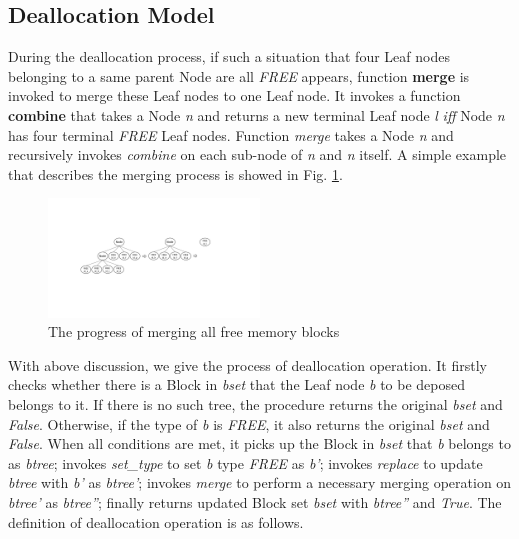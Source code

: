 \subsection{Deallocation Model}
During the deallocation process, if such a situation that four Leaf nodes belonging to a same parent Node are all \emph{FREE} appears, function \textbf{merge} is invoked to merge these Leaf nodes to one Leaf node. It invokes a function \textbf{combine} that takes a Node \emph{n} and returns a new terminal Leaf node \emph{l} \emph{iff} Node \emph{n} has four terminal \emph{FREE} Leaf nodes. Function \emph{merge} takes a Node \emph{n} and recursively invokes \emph{combine} on each sub-node of \emph{n} and \emph{n} itself. A simple example that describes the merging process is showed in Fig. \ref{fig2}.

\begin{figure}[htbp]
	\centering
	\includegraphics[width=0.5\textwidth]{fig2.pdf}
	\caption{The progress of merging all free memory blocks}
	\label{fig2}
\end{figure}

With above discussion, we give the process of deallocation operation. It firstly checks whether there is a Block in \emph{bset} that the Leaf node \emph{b} to be deposed belongs to it. If there is no such tree, the procedure returns the original \emph{bset} and \emph{False}. Otherwise, if the type of \emph{b} is \emph{FREE}, it also returns the original \emph{bset} and \emph{False}. When all conditions are met, it picks up the Block in \emph{bset} that \emph{b} belongs to as \emph{btree}; invokes \emph{set\_type} to set \emph{b} type \emph{FREE} as \emph{b'}; invokes \emph{replace} to update \emph{btree} with \emph{b'} as \emph{btree'}; invokes \emph{merge} to perform a necessary merging operation on \emph{btree'} as \emph{btree''}; finally returns updated Block set \emph{bset} with \emph{btree''} and \emph{True}. The definition of deallocation operation is as follows.

